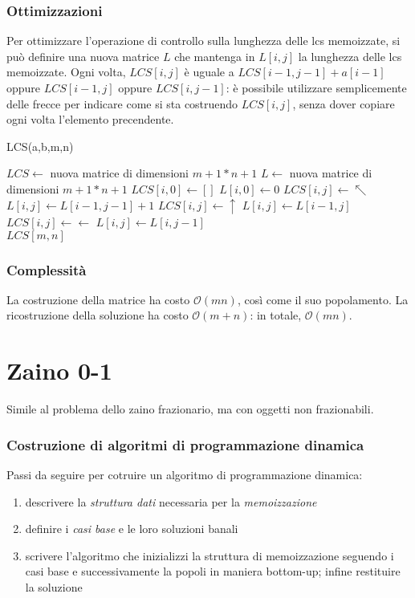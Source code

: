 \documentclass[11pt]{book}
\begin{document}
\subsubsection{Ottimizzazioni}
Per ottimizzare l'operazione di controllo sulla lunghezza delle lcs memoizzate, si può definire una nuova matrice $L$ che 
mantenga in $L[i,j]$ la lunghezza delle lcs memoizzate.
Ogni volta, $LCS[i,j]$ è uguale a $LCS[i-1,j-1]+a[i-1]$ oppure $LCS[i-1,j]$ oppure $LCS[i,j-1]$: è possibile utilizzare 
semplicemente delle frecce per indicare come si sta costruendo $LCS[i,j]$, senza dover copiare ogni volta l'elemento precendente.
\begin{algorithm}
    \caption{LCS(a,b,m,n)}
    \begin{algorithmic}
        \State $LCS\gets$ nuova matrice di dimensioni $m+1*n+1$
        \State $L\gets$ nuova matrice di dimensioni $m+1*n+1$
            \State $LCS[i,0]\gets []$  
            \State $L[i,0]\gets 0$
        \EndFor 
                    \State $LCS[i,j]\gets \nwarrow$
                    \State $L[i,j]\gets L[i-1,j-1]+1$
                    \State $LCS[i,j]\gets \uparrow$
                    \State $L[i,j]\gets L[i-1,j]$
                \Else 
                    \State $LCS[i,j]\gets \leftarrow$
                    \State $L[i,j]\gets L[i,j-1]$
                \EndIf 
            \EndFor 
        \EndFor\\
        \Return $LCS[m,n]$
    \end{algorithmic}
\end{algorithm}
\subsubsection{Complessità}
La costruzione della matrice ha costo $\mathcal{O}(mn)$, così come il suo popolamento. La ricostruzione della soluzione 
ha costo $\mathcal{O}(m+n)$: in totale, $\mathcal{O}(mn)$.
\section{Zaino 0-1}
Simile al problema dello zaino frazionario, ma con oggetti non frazionabili.
\subsubsection{Costruzione di algoritmi di programmazione dinamica}
Passi da seguire per cotruire un algoritmo di programmazione dinamica:
\begin{enumerate}
    \item descrivere la \textit{struttura dati} necessaria per la \textit{memoizzazione}
    \item definire i \textit{casi base} e le loro soluzioni banali
    \item scrivere l'algoritmo che inizializzi la struttura di memoizzazione seguendo i casi base e successivamente la 
    popoli in maniera bottom-up; infine restituire la soluzione 
\end{enumerate}
\end{document}
